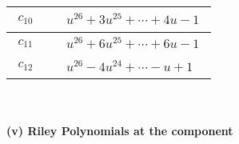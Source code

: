 \documentclass[1p]{elsarticle_modified}
\theoremstyle{definition}
\begin{document}
\begin{tabular}{m{50pt}|m{274pt}}
\hline $$\begin{aligned}c_{10}\end{aligned}$$&$\begin{aligned}
&u^{26}+3 u^{25}+\cdots+4 u-1
\end{aligned}$\\
\hline $$\begin{aligned}c_{11}\end{aligned}$$&$\begin{aligned}
&u^{26}+6 u^{25}+\cdots+6 u-1
\end{aligned}$\\
\hline $$\begin{aligned}c_{12}\end{aligned}$$&$\begin{aligned}
&u^{26}-4 u^{24}+\cdots- u+1
\end{aligned}$\\
\hline
\end{tabular}\\~\\
\newpage\renewcommand{\arraystretch}{1}
\flushleft \textbf{(v) Riley Polynomials at the component}\newline \\
\end{document}
